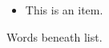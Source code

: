 \begin{figure}
  \centering
  \begin{itemize}
  \item This is an item.
  \end{itemize}
  \caption{\label{fig:cool-label-to-use-as-ref}Words beneath list.}
\end{figure}
